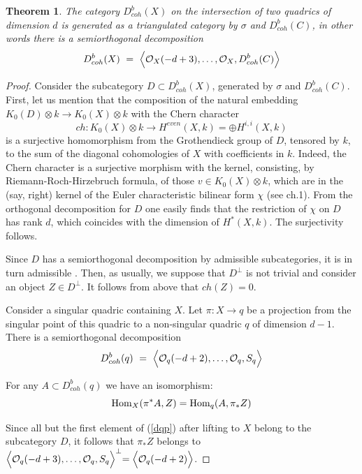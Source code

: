 \documentclass[12pt]{article}
\newtheorem{theorem}{Theorem}[section]
\def\db#1{ D^b_{coh}({#1})}
\begin{document}
\begin{theorem}\label{qdq}
The category $\db{X}$ on the intersection of two quadrics of dimension $d$ is generated as a triangulated category by
$\sigma $ and $\db{C}$, in other words there is a semiorthogonal decomposition
$$
\db{X}\ =\ \Bigl\langle{\cal O}_X(-d+3),\ldots,{\cal O}_X,\db{C}\Bigl\rangle
$$
\end{theorem}
\begin{proof}
Consider the subcategory $D\subset \db{X}$, generated by 
$\sigma $ and $\db{C}$. First, let us mention that the composition of the natural embedding $K_0(D)\otimes k\to
  K_0(X)\otimes k$ with the Chern character
$$
ch:K_0(X)\otimes k\to H^{even}(X,k)=\oplus H^{i,i}(X,k)
$$
is a surjective homomorphism from the Grothendieck group
of $D$, tensored by $k$, to the sum of the diagonal cohomologies of $X$ with coefficients in $k$. Indeed, the Chern character is a surjective morphism with the kernel, consisting, by Riemann-Roch-Hirzebruch formula, of those $v\in K_0(X)\otimes k$, which are in the (say, right) kernel
 of the Euler characteristic bilinear form $\chi $ (see ch.1).
From the orthogonal decomposition for $D$ one easily finds that the restriction of $\chi $ on $D$ has rank $d$, which coincides with the dimension of $H^*(X,k)$. The surjectivity
 follows.

Since $D$ has a semiorthogonal decomposition by admissible subcategories, it is in turn admissible \cite{BK}. Then, as usually, we suppose that $D^{\perp }$ is not trivial and consider an object $Z\in D^{\perp }$. It follows from above that $ch(Z)=0$.

Consider a singular quadric containing $X$. Let $\pi :X\to q$ be a projection from the singular point of this quadric to a non-singular quadric $q$ of dimension $d-1$.
There is a semiorthogonal decomposition
\begin{equation}\label{dqp}
\db{q}\ =\ \Bigl\langle{\cal O}_q(-d+2),\ldots,{\cal O}_q,S_q\Bigl\rangle
\end{equation}

For any $A\subset \db{q}$ we have an isomorphism:
$$
{\rm Hom}_X(\pi ^{*}A,Z)={\rm Hom}_q(A,\pi _{*}Z)
$$

Since all but the first element of (\ref{dqp}) after lifting to $X$ belong to the subcategory $D$, it follows that $\pi _{*}Z$
belongs to $\Bigl\langle{\cal O}_q(-d+3),\ldots,{\cal O}_q,S_q\Bigl\rangle ^{\perp }=\Bigl\langle{\cal O}_q(-d+2)\Bigl\rangle$.
\end{proof}
\end{document}
